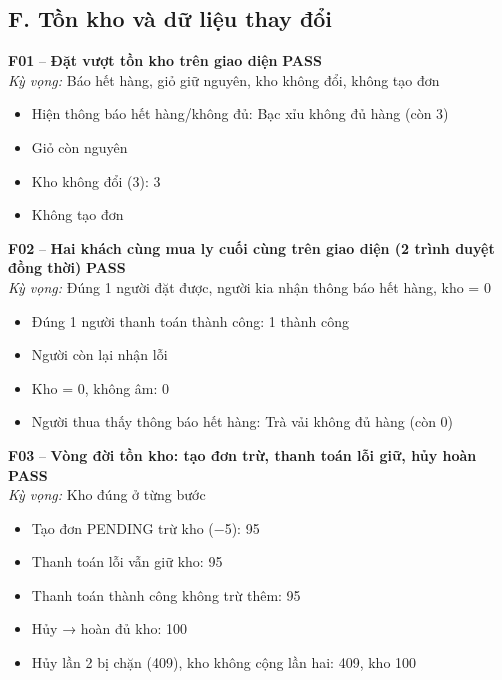 \documentclass[a4paper,11pt]{article}
\newcommand{\ok}{\textcolor{okgreen}{\textbf{PASS}}}
\begin{document}
\subsection{F. Tồn kho và dữ liệu thay đổi}
\begin{minipage}{\textwidth}\vspace{4pt}\textbf{\textcolor{brew}{F01}} -- \textbf{Đặt vượt tồn kho trên giao diện} \hfill \ok\\
{\small\emph{Kỳ vọng:} Báo hết hàng, giỏ giữ nguyên, kho không đổi, không tạo đơn}
\end{minipage}
\begin{itemize}\footnotesize
\item \tick Hiện thông báo hết hàng/không đủ: Bạc xỉu không đủ hàng (còn 3)
\item \tick Giỏ còn nguyên
\item \tick Kho không đổi (3): 3
\item \tick Không tạo đơn
\end{itemize}
\begin{minipage}{\textwidth}\vspace{4pt}\textbf{\textcolor{brew}{F02}} -- \textbf{Hai khách cùng mua ly cuối cùng trên giao diện (2 trình duyệt đồng thời)} \hfill \ok\\
{\small\emph{Kỳ vọng:} Đúng 1 người đặt được, người kia nhận thông báo hết hàng, kho = 0}
\end{minipage}
\begin{itemize}\footnotesize
\item \tick Đúng 1 người thanh toán thành công: 1 thành công
\item \tick Người còn lại nhận lỗi
\item \tick Kho = 0, không âm: 0
\item \tick Người thua thấy thông báo hết hàng: Trà vải không đủ hàng (còn 0)
\end{itemize}
\begin{minipage}{\textwidth}\vspace{4pt}\textbf{\textcolor{brew}{F03}} -- \textbf{Vòng đời tồn kho: tạo đơn trừ, thanh toán lỗi giữ, hủy hoàn} \hfill \ok\\
{\small\emph{Kỳ vọng:} Kho đúng ở từng bước}
\end{minipage}
\begin{itemize}\footnotesize
\item \tick Tạo đơn PENDING trừ kho (−5): 95
\item \tick Thanh toán lỗi vẫn giữ kho: 95
\item \tick Thanh toán thành công không trừ thêm: 95
\item \tick Hủy → hoàn đủ kho: 100
\item \tick Hủy lần 2 bị chặn (409), kho không cộng lần hai: 409, kho 100
\end{itemize}
\end{document}
